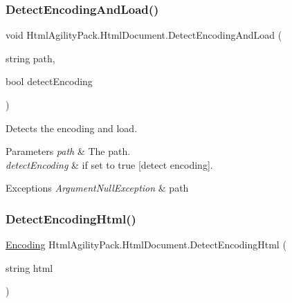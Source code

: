 \subsubsection{\texorpdfstring{Detect\+Encoding\+And\+Load()}{DetectEncodingAndLoad()}\hspace{0.1cm}{\footnotesize\ttfamily [2/2]}}
{\footnotesize\ttfamily void Html\+Agility\+Pack.\+Html\+Document.\+Detect\+Encoding\+And\+Load (\begin{DoxyParamCaption}\item[{string}]{path,  }\item[{bool}]{detect\+Encoding }\end{DoxyParamCaption})\hspace{0.3cm}{\ttfamily [inline]}}



Detects the encoding and load. 


\begin{DoxyParams}{Parameters}
{\em path} & The path.\\
\hline
{\em detect\+Encoding} & if set to {\ttfamily true} \mbox{[}detect encoding\mbox{]}.\\
\hline
\end{DoxyParams}

\begin{DoxyExceptions}{Exceptions}
{\em Argument\+Null\+Exception} & path\\
\hline
\end{DoxyExceptions}
\mbox{\label{class_html_agility_pack_1_1_html_document_aadb4046a4fdb71a31fd57357bfd5a5c4}} 
\subsubsection{\texorpdfstring{Detect\+Encoding\+Html()}{DetectEncodingHtml()}}
{\footnotesize\ttfamily \hyperlink{class_html_agility_pack_1_1_html_document_a220bdf28a5e35f4898075084be2d59f0}{Encoding} Html\+Agility\+Pack.\+Html\+Document.\+Detect\+Encoding\+Html (\begin{DoxyParamCaption}\item[{string}]{html }\end{DoxyParamCaption})\hspace{0.3cm}{\ttfamily [inline]}}



